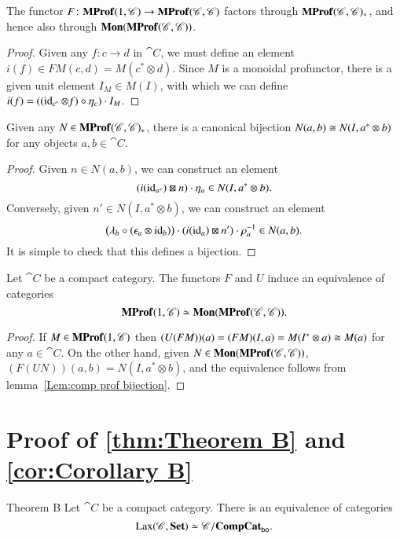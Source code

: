\documentclass[12pt,oneside,article,draft]{memoir}
\begin{document}
\begin{proposition}\label{Prop:canonical unit}
	The functor $F\colon\mathbf{MProf}(1,\mathscr{C})\to\mathbf{MProf}(\mathscr{C},\mathscr{C})$ factors through $\mathbf{MProf}(\mathscr{C},\mathscr{C})_*$, and hence also through $\mathbf{Mon}(\mathbf{MProf}(\mathscr{C},\mathscr{C}))$.
\end{proposition}
\begin{proof}
	Given any $f\colon c\to d$ in $\cat{C}$, we must define an element $i(f)\in FM(c,d)=M(c^*\otimes d)$. Since $M$ is a monoidal profunctor, there is a given unit element $I_M\in M(I)$, with which we can define $i(f)=((\operatorname{id}_{c^*}\otimes f)\circ\eta_c)\cdot I_M$.
\end{proof}

\begin{lemma}\label{Lem:comp prof bijection}
  Given any $N\in\mathbf{MProf}(\mathscr{C},\mathscr{C})_*$, there is a canonical bijection $N(a,b)\cong N(I,a^*\otimes b)$ for any objects $a,b\in\cat{C}$.
\end{lemma}
\begin{proof}
  Given $n\in N(a,b)$, we can construct an element
  \[
    (i(\operatorname{id}_{a^*})\boxtimes n)\cdot\eta_a \in N(I,a^*\otimes b).
  \]
  Conversely, given $n'\in N(I,a^*\otimes b)$, we can construct an element 
  \[
    \bigl(\lambda_b\circ(\epsilon_a\otimes\operatorname{id}_b)\bigr)\cdot(i(\operatorname{id}_a)\boxtimes n')\cdot\rho_a^{-1} \in N(a,b).
  \]
  It is simple to check that this defines a bijection.
\end{proof}

\begin{proposition}\label{Prop:mon prof equivalence}
	Let $\cat{C}$ be a compact category. The functors $F$ and $U$ induce an equivalence of categories 
  \[
    \mathbf{MProf}(1,\mathscr{C})\simeq\mathbf{Mon}(\mathbf{MProf}(\mathscr{C},\mathscr{C})).
  \]
\end{proposition}
\begin{proof}
  If $M\in\mathbf{MProf}(1,\mathscr{C})$ then $(U(FM))(a)=(FM)(I,a)=M(I^*\otimes a)\cong M(a)$ for any $a\in\cat{C}$. On the other hand, given $N\in\mathbf{Mon}(\mathbf{MProf}(\mathscr{C},\mathscr{C}))$, $(F(UN))(a,b)=N(I,a^*\otimes b)$, and the equivalence follows from lemma~\ref{Lem:comp prof bijection}.
\end{proof}

\section{Proof of \ref{thm:Theorem B} and \ref{cor:Corollary B}}\label{sec:proof of Bs}

 \begin{named}{Theorem B}\label{thm:Theorem B}
 	Let $\cat{C}$ be a compact category. There is an equivalence of categories
  \[
    \operatorname{Lax}(\mathscr{C},\mathbf{Set})\simeq\mathscr{C}/\mathbf{CompCat}_{\mathsf{bo}}.
  \]
 \end{named}
\end{document}
